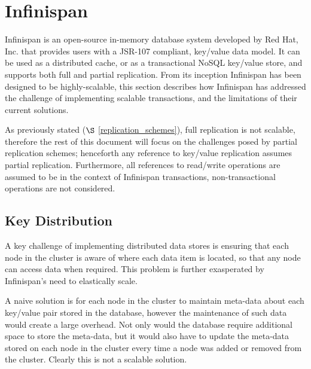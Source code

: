 
\section{Infinispan}\label{sec:infinispan}
Infinispan\citep{Infinispan} is an open-source in-memory database system developed by Red Hat, Inc\citep{RedHat}. that provides users with a JSR-107\citep{JSR-107} compliant, key/value data model.  It can be used as a distributed cache, or as a transactional NoSQL key/value store, and supports both full and partial replication.  From its inception Infinispan has been designed  to be highly-scalable, this section describes how Infinispan has addressed the challenge of implementing scalable transactions, and the limitations of their current solutions.  

As previously stated ($\S$ \ref{replication_schemes}), full replication is not scalable, therefore the rest of this document will focus on the challenges posed by partial replication schemes; henceforth any reference to key/value replication assumes partial replication.  Furthermore, all references to read/write operations are assumed to be in the context of Infinispan transactions, non-transactional operations are not considered.  

    \subsection{Key Distribution}
    A key challenge of implementing distributed data stores is ensuring that each node in the cluster is aware of where each data item is located, so that any node can access data when required.  This problem is further exasperated by Infinispan's need to elastically scale.  
    
    A naive solution is for each node in the cluster to maintain meta-data about each key/value pair stored in the database, however the maintenance of such data would create a large overhead.  Not only would the database require additional space to store the meta-data, but it would also have to update the meta-data stored on each node in the cluster every time a node was added or removed from the cluster.  Clearly this is not a scalable solution.  
    
